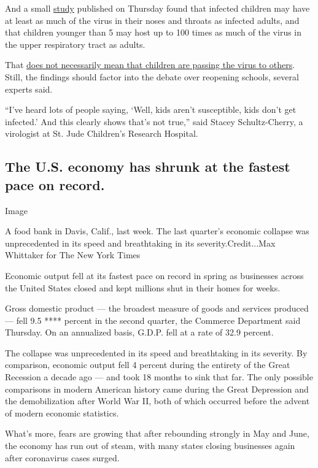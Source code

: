 And a small
\href{https://jamanetwork.com/journals/jamapediatrics/fullarticle/2768952}{study}
published on Thursday found that infected children may have at least as
much of the virus in their noses and throats as infected adults, and
that children younger than 5 may host up to 100 times as much of the
virus in the upper respiratory tract as adults.

That
\href{https://www.nytimes3xbfgragh.onion/2020/07/30/health/coronavirus-children.html}{does
not necessarily mean that children are passing the virus to others}.
Still, the findings should factor into the debate over reopening
schools, several experts said.

``I've heard lots of people saying, `Well, kids aren't susceptible, kids
don't get infected.' And this clearly shows that's not true,'' said
Stacey Schultz-Cherry, a virologist at St. Jude Children's Research
Hospital.

\hypertarget{the-us-economy-has-shrunk-at-the-fastest-pace-on-record}{%
\subsection{The U.S. economy has shrunk at the fastest pace on
record.}\label{the-us-economy-has-shrunk-at-the-fastest-pace-on-record}}

Image

A food bank in Davis, Calif., last week. The last quarter's economic
collapse was unprecedented in its speed and breathtaking in its
severity.Credit...Max Whittaker for The New York Times

Economic output fell at its fastest pace on record in spring as
businesses across the United States closed and kept millions shut in
their homes for weeks.

Gross domestic product --- the broadest measure of goods and services
produced --- fell 9.5 **** percent in the second quarter, the Commerce
Department said Thursday. On an annualized basis, G.D.P. fell at a rate
of 32.9 percent.

The collapse was unprecedented in its speed and breathtaking in its
severity. By comparison, economic output fell 4 percent during the
entirety of the Great Recession a decade ago --- and took 18 months to
sink that far. The only possible comparisons in modern American history
came during the Great Depression and the demobilization after World War
II, both of which occurred before the advent of modern economic
statistics.

What's more, fears are growing that after rebounding strongly in May and
June, the economy has run out of steam, with many states closing
businesses again after coronavirus cases surged.

